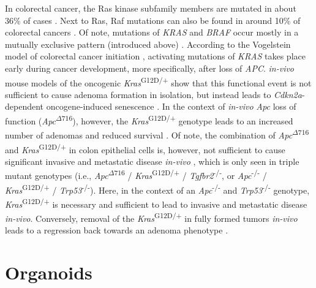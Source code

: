 \begin{flushleft}
In colorectal cancer, the Ras kinase subfamily members are mutated in about 36\% of cases \parencite{fangMAPKSignallingPathways2005}. Next to Ras, Raf mutations can also be found in around 10\% of colorectal cancers \parencite{fangMAPKSignallingPathways2005}. Of note, mutations of \textit{KRAS} and \textit{BRAF} occur mostly in a mutually exclusive pattern (introduced above) \parencite{fangMAPKSignallingPathways2005, minaConditionalSelectionGenomic2017}. According to the Vogelstein model of colorectal cancer initiation \parencite{fearonMolecularGeneticsColorectal2011}, activating mutations of \textit{KRAS} takes place early during cancer development, more specifically, after loss of \textit{APC}. \textit{in-vivo} mouse models of the oncogenic \textit{Kras}\textsuperscript{G12D/+} show that this functional event is not sufficient to cause adenoma formation in isolation, but instead leads to \textit{Cdkn2a}-dependent oncogene-induced senescence \parencite{benneckeInk4aArfOncogeneinduced2010}. In the context of \textit{in-vivo} \textit{Apc} loss of function (\textit{Apc}\textsuperscript{$\Delta716$}), however, the \textit{Kras}\textsuperscript{G12D/+} genotype leads to an increased number of adenomas and reduced survival \parencite{sakaiCombinedMutationApc2018a}. Of note, the combination of \textit{Apc}\textsuperscript{$\Delta716$} and \textit{Kras}\textsuperscript{G12D/+} in colon epithelial cells is, however, not sufficient to cause significant invasive and metastatic disease \textit{in-vivo} \parencite{sakaiCombinedMutationApc2018a, boutinOncogenicKrasDrives2017a}, which is only seen in triple mutant genotypes (i.e., \textit{Apc}\textsuperscript{$\Delta716$} / \textit{Kras}\textsuperscript{G12D/+} / \textit{Tgfbr2}\textsuperscript{-/-}, or \textit{Apc}\textsuperscript{-/-} / \textit{Kras}\textsuperscript{G12D/+} / \textit{Trp53}\textsuperscript{-/-}). Here, in the context of an \textit{Apc}\textsuperscript{-/-} and \textit{Trp53}\textsuperscript{-/-} genotype, \textit{Kras}\textsuperscript{G12D/+} is necessary and sufficient to lead to invasive and metastatic disease \textit{in-vivo}. Conversely, removal of the \textit{Kras}\textsuperscript{G12D/+} in fully formed tumors \textit{in-vivo} leads to a regression back towards an adenoma phenotype \parencite{boutinOncogenicKrasDrives2017a}.



\section{Organoids}


\end{flushleft}
